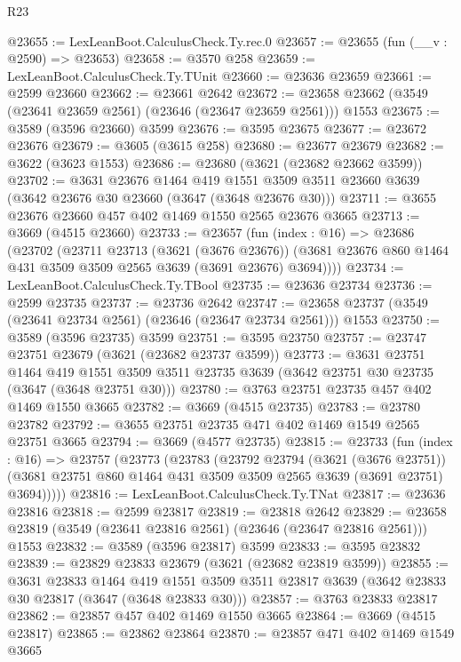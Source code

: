 \begin{lexlean}{R23}
\begin{coremodule}
@23655 := LexLeanBoot.CalculusCheck.Ty.rec.{0}
@23657 := @23655 (fun (__v : @2590) => @23653)
@23658 := @3570 @258
@23659 := LexLeanBoot.CalculusCheck.Ty.TUnit
@23660 := @23636 @23659
@23661 := @2599 @23660
@23662 := @23661 @2642
@23672 := @23658 @23662 (@3549 (@23641 @23659 @2561) (@23646 (@23647 @23659 @2561))) @1553
@23675 := @3589 (@3596 @23660) @3599
@23676 := @3595 @23675
@23677 := @23672 @23676
@23679 := @3605 (@3615 @258)
@23680 := @23677 @23679
@23682 := @3622 (@3623 @1553)
@23686 := @23680 (@3621 (@23682 @23662 @3599))
@23702 := @3631
    @23676
    @1464
    @419
    @1551
    @3509
    @3511
    @23660
    @3639
    (@3642 @23676 @30 @23660 (@3647 (@3648 @23676 @30)))
@23711 := @3655 @23676 @23660 @457 @402 @1469 @1550 @2565 @23676 @3665
@23713 := @3669 (@4515 @23660)
@23733 := @23657
    (fun (index : @16) =>
    @23686
      (@23702
        (@23711
          @23713
          (@3621 (@3676 @23676))
          (@3681 @23676 @860 @1464 @431 @3509 @3509 @2565 @3639 (@3691 @23676) @3694))))
@23734 := LexLeanBoot.CalculusCheck.Ty.TBool
@23735 := @23636 @23734
@23736 := @2599 @23735
@23737 := @23736 @2642
@23747 := @23658 @23737 (@3549 (@23641 @23734 @2561) (@23646 (@23647 @23734 @2561))) @1553
@23750 := @3589 (@3596 @23735) @3599
@23751 := @3595 @23750
@23757 := @23747 @23751 @23679 (@3621 (@23682 @23737 @3599))
@23773 := @3631
    @23751
    @1464
    @419
    @1551
    @3509
    @3511
    @23735
    @3639
    (@3642 @23751 @30 @23735 (@3647 (@3648 @23751 @30)))
@23780 := @3763 @23751 @23735 @457 @402 @1469 @1550 @3665
@23782 := @3669 (@4515 @23735)
@23783 := @23780 @23782
@23792 := @3655 @23751 @23735 @471 @402 @1469 @1549 @2565 @23751 @3665
@23794 := @3669 (@4577 @23735)
@23815 := @23733
    (fun (index : @16) =>
    @23757
      (@23773
        (@23783
          (@23792
            @23794
            (@3621 (@3676 @23751))
            (@3681 @23751 @860 @1464 @431 @3509 @3509 @2565 @3639 (@3691 @23751) @3694)))))
@23816 := LexLeanBoot.CalculusCheck.Ty.TNat
@23817 := @23636 @23816
@23818 := @2599 @23817
@23819 := @23818 @2642
@23829 := @23658 @23819 (@3549 (@23641 @23816 @2561) (@23646 (@23647 @23816 @2561))) @1553
@23832 := @3589 (@3596 @23817) @3599
@23833 := @3595 @23832
@23839 := @23829 @23833 @23679 (@3621 (@23682 @23819 @3599))
@23855 := @3631
    @23833
    @1464
    @419
    @1551
    @3509
    @3511
    @23817
    @3639
    (@3642 @23833 @30 @23817 (@3647 (@3648 @23833 @30)))
@23857 := @3763 @23833 @23817
@23862 := @23857 @457 @402 @1469 @1550 @3665
@23864 := @3669 (@4515 @23817)
@23865 := @23862 @23864
@23870 := @23857 @471 @402 @1469 @1549 @3665

\end{coremodule}
\end{lexlean}
